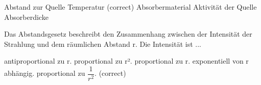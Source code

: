 \documentclass[11pt]{exam}
\begin{document}
\begin{questions}
\begin{choices}
	\choice Abstand zur Quelle
	\choice Temperatur (correct)
	\choice Absorbermaterial
	\choice Aktivität der Quelle
	\choice Absorberdicke
\end{choices}

\vspace{3mm}\question Das Abstandsgesetz beschreibt den Zusammenhang zwischen der Intensität der Strahlung und dem räumlichen Abstand r. Die Intensität ist ...

\begin{choices}
	\choice antiproportional zu r.
	\choice proportional zu r².
	\choice proportional zu r.
	\choice exponentiell von r abhängig.
	\choice proportional zu \( \dfrac{1}{r^2} \). (correct)
\end{choices}

\vspace{3mm}\end{questions}
\end{document}
